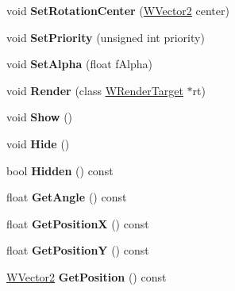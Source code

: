 \begin{DoxyCompactItemize}
\item 
void {\bfseries Set\+Rotation\+Center} (\hyperlink{class_w_vector2}{W\+Vector2} center)\hypertarget{class_w_sprite_abe17279e0581e28329b90cfe049680b9}{}\label{class_w_sprite_abe17279e0581e28329b90cfe049680b9}

\item 
void {\bfseries Set\+Priority} (unsigned int priority)\hypertarget{class_w_sprite_a9729f09e4a38c3ddbec0c19d6b1f0437}{}\label{class_w_sprite_a9729f09e4a38c3ddbec0c19d6b1f0437}

\item 
void {\bfseries Set\+Alpha} (float f\+Alpha)\hypertarget{class_w_sprite_a627d9166d63c3a397d3e0f562f76476f}{}\label{class_w_sprite_a627d9166d63c3a397d3e0f562f76476f}

\item 
void {\bfseries Render} (class \hyperlink{class_w_render_target}{W\+Render\+Target} $\ast$rt)\hypertarget{class_w_sprite_a29fb899745e72e20126e9b00c551b588}{}\label{class_w_sprite_a29fb899745e72e20126e9b00c551b588}

\item 
void {\bfseries Show} ()\hypertarget{class_w_sprite_af6cd53a940fa3159dcfc9f17a6f56f8f}{}\label{class_w_sprite_af6cd53a940fa3159dcfc9f17a6f56f8f}

\item 
void {\bfseries Hide} ()\hypertarget{class_w_sprite_af1200725520adddb10c391d85c3c3188}{}\label{class_w_sprite_af1200725520adddb10c391d85c3c3188}

\item 
bool {\bfseries Hidden} () const \hypertarget{class_w_sprite_a116022ff027805e02d56c5cad62986d0}{}\label{class_w_sprite_a116022ff027805e02d56c5cad62986d0}

\item 
float {\bfseries Get\+Angle} () const \hypertarget{class_w_sprite_a62af67125aa8a37969bdbc58babf905b}{}\label{class_w_sprite_a62af67125aa8a37969bdbc58babf905b}

\item 
float {\bfseries Get\+PositionX} () const \hypertarget{class_w_sprite_a7f2d81d7e131b3aefd01d34ccddb6b44}{}\label{class_w_sprite_a7f2d81d7e131b3aefd01d34ccddb6b44}

\item 
float {\bfseries Get\+PositionY} () const \hypertarget{class_w_sprite_ace341c4755fc4364c1e4a0931cb20d0b}{}\label{class_w_sprite_ace341c4755fc4364c1e4a0931cb20d0b}

\item 
\hyperlink{class_w_vector2}{W\+Vector2} {\bfseries Get\+Position} () const \hypertarget{class_w_sprite_a9be69ce82e7ca756c255159ee716aeae}{}\label{class_w_sprite_a9be69ce82e7ca756c255159ee716aeae}


\end{DoxyCompactItemize}
